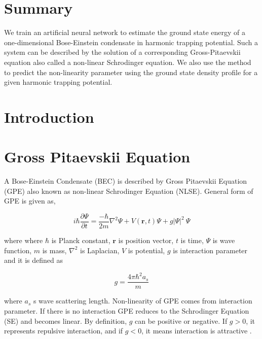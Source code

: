 \documentclass[a4paper,times,12pt]{article}
\begin{document}
\setcounter{page}{1}

\section*{Summary}

We train an artificial neural network to estimate the ground state energy
of a one-dimensional Bose-Einstein condensate in harmonic trapping potential.
Such a system can be described by the solution of a corresponding
Gross-Pitaevskii equation also called a non-linear Schrodinger equation.
We also use the method to predict the non-linearity parameter using the ground
state density profile for a given harmonic trapping potential.


\section{Introduction}
\section{Gross Pitaevskii Equation}

A Bose-Einstein Condensate (BEC) is described by Gross Pitaevskii Equation (GPE) also known as non-linear Schrodinger Equation (NLSE). General form of GPE is given as,

\begin{equation}
\label{eq:GPE_3D}
i \hbar \frac {\partial \Psi}{\partial t} = \frac {-\hbar}{2m}\nabla^2
\Psi + V(\boldsymbol{r}, t)\Psi + g|\Psi|^2\ \Psi
\end{equation}


where %
where $\hbar$ is Planck constant, $\boldsymbol{r}$ is position vector, $t$ is time, $\Psi$ is wave function, $m$ is mass, $\nabla^2$ is Laplacian, $V$ is potential, $g$ is interaction parameter and it is defined as 

\begin{equation}
\label{eq:GPE_inter_param}
g=\frac{4\pi\hbar^2a_s}{m}
\end{equation}

where $a_s$ s wave scattering length. Non-linearity of GPE comes from interaction parameter. If there is no interaction GPE reduces to the Schrodinger Equation (SE) and becomes linear. By definition, $g$ can be positive or negative. If $g > 0$, it represents repulsive interaction, and if $g < 0$, it means interaction is attractive \cite{barenghi2016primer}.
\end{document}
